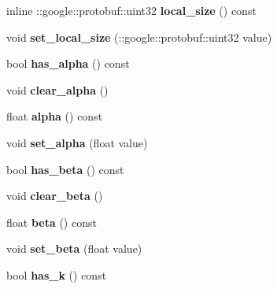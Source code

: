 \begin{DoxyCompactItemize}
inline \+::google\+::protobuf\+::uint32 {\bfseries local\+\_\+size} () const
\item 
\mbox{\label{classcaffe_1_1_v0_layer_parameter_a34e77253ee8b339313a56aec3e27e942}} 
void {\bfseries set\+\_\+local\+\_\+size} (\+::google\+::protobuf\+::uint32 value)
\item 
\mbox{\label{classcaffe_1_1_v0_layer_parameter_a3cc3f7dc7c51092cec85db1ad91c78fa}} 
bool {\bfseries has\+\_\+alpha} () const
\item 
\mbox{\label{classcaffe_1_1_v0_layer_parameter_a71b72195d57d89637bdfffd9c0010005}} 
void {\bfseries clear\+\_\+alpha} ()
\item 
\mbox{\label{classcaffe_1_1_v0_layer_parameter_ad1482942af8f1ed3b6e38d3837a57cfb}} 
float {\bfseries alpha} () const
\item 
\mbox{\label{classcaffe_1_1_v0_layer_parameter_a2d48fc16d94f4d47f469d91d3e335621}} 
void {\bfseries set\+\_\+alpha} (float value)
\item 
\mbox{\label{classcaffe_1_1_v0_layer_parameter_a7efb1ab991b0f7b6efc8a81e66734352}} 
bool {\bfseries has\+\_\+beta} () const
\item 
\mbox{\label{classcaffe_1_1_v0_layer_parameter_afd150a0acc8d019ddf1444c6ce27b8ed}} 
void {\bfseries clear\+\_\+beta} ()
\item 
\mbox{\label{classcaffe_1_1_v0_layer_parameter_aab23fd2c3f0a6b1a0e27c8d6de7815d9}} 
float {\bfseries beta} () const
\item 
\mbox{\label{classcaffe_1_1_v0_layer_parameter_a97bf76fcda188b5716c44131e8904266}} 
void {\bfseries set\+\_\+beta} (float value)
\item 
\mbox{\label{classcaffe_1_1_v0_layer_parameter_a2f85ca9c676aafb82e8ef9c85c30bac9}} 
bool {\bfseries has\+\_\+k} () const

\end{DoxyCompactItemize}
